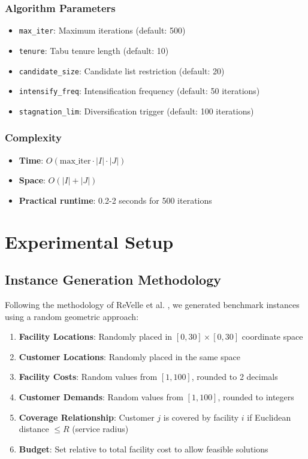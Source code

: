 \documentclass[11pt,a4paper]{article}
\begin{document}
\subsubsection{Algorithm Parameters}
\begin{itemize}
  \item \texttt{max\_iter}: Maximum iterations (default: 500)
  \item \texttt{tenure}: Tabu tenure length (default: 10)
  \item \texttt{candidate\_size}: Candidate list restriction (default: 20)
  \item \texttt{intensify\_freq}: Intensification frequency (default: 50 iterations)
  \item \texttt{stagnation\_lim}: Diversification trigger (default: 100 iterations)
\end{itemize}

\subsubsection{Complexity}
\begin{itemize}
  \item \textbf{Time}: $O(\text{max\_iter} \cdot |I| \cdot |J|)$
  \item \textbf{Space}: $O(|I| + |J|)$
  \item \textbf{Practical runtime}: 0.2-2 seconds for 500 iterations
\end{itemize}

\newpage
\section{Experimental Setup}

\subsection{Instance Generation Methodology}

Following the methodology of ReVelle et al. \cite{revelle2008}, we generated benchmark instances using a random geometric approach:

\begin{enumerate}
  \item \textbf{Facility Locations}: Randomly placed in $[0, 30] \times [0, 30]$ coordinate space
  \item \textbf{Customer Locations}: Randomly placed in the same space
  \item \textbf{Facility Costs}: Random values from $[1, 100]$, rounded to 2 decimals
  \item \textbf{Customer Demands}: Random values from $[1, 100]$, rounded to integers
  \item \textbf{Coverage Relationship}: Customer $j$ is covered by facility $i$ if Euclidean distance $\leq R$ (service radius)
  \item \textbf{Budget}: Set relative to total facility cost to allow feasible solutions
\end{enumerate}
\end{document}
